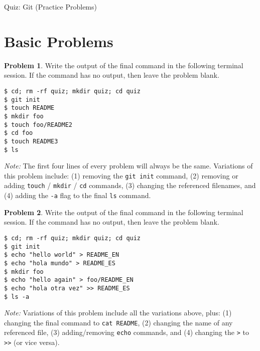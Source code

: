 \documentclass[10pt]{article}
\theoremstyle{definition}
\newtheorem{problem}{Problem}
\begin{document}
\begin{center}
    {
\Large
    Quiz: Git (Practice Problems)
}


    \vspace{0.1in}
\end{center}

\section{Basic Problems}

\begin{problem}
    Write the output of the final command in the following terminal session.
    If the command has no output, then leave the problem blank.
\end{problem}
\begin{lstlisting}
$ cd; rm -rf quiz; mkdir quiz; cd quiz
$ git init
$ touch README
$ mkdir foo
$ touch foo/README2
$ cd foo
$ touch README3
$ ls
\end{lstlisting}
\textit{Note:}
The first four lines of every problem will always be the same.
Variations of this problem include:
(1) removing the \lstinline{git init} command,
(2) removing or adding \lstinline{touch} / \lstinline{mkdir} / \lstinline{cd} commands,
(3) changing the referenced filenames,
and (4) adding the \lstinline{-a} flag to the final \lstinline{ls} command.
\vspace{0.3in}


\begin{problem}
    Write the output of the final command in the following terminal session.
    If the command has no output, then leave the problem blank.
\end{problem}
\begin{lstlisting}
$ cd; rm -rf quiz; mkdir quiz; cd quiz
$ git init
$ echo "hello world" > README_EN
$ echo "hola mundo" > README_ES
$ mkdir foo
$ echo "hello again" > foo/README_EN
$ echo "hola otra vez" >> README_ES
$ ls -a
\end{lstlisting}
\textit{Note:}
Variations of this problem include all the variations above,
plus:
(1) changing the final command to \lstinline{cat README},
(2) changing the name of any referenced file,
(3) adding/removing \lstinline{echo} commands,
and (4) changing the \lstinline{>} to \lstinline{>>} (or vice versa).

\end{document}
